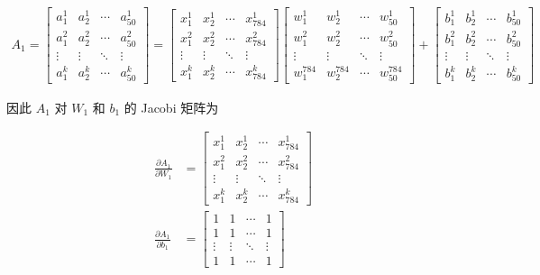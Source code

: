\documentclass[12pt,a4paper]{amsart}
\begin{document}
\begin{equation}
	\begin{aligned}
		A_1 = \begin{bmatrix}
			a_1^1  & a_2^1  & \cdots & a_{50}^1 \\
			a_1^2  & a_2^2  & \cdots & a_{50}^2 \\
			\vdots & \vdots & \ddots & \vdots   \\
			a_1^k  & a_2^k  & \cdots & a_{50}^k
		\end{bmatrix}
		= \begin{bmatrix}
			x_1^1  & x_2^1  & \cdots & x_{784}^1 \\
			x_1^2  & x_2^2  & \cdots & x_{784}^2 \\
			\vdots & \vdots & \ddots & \vdots    \\
			x_1^k  & x_2^k  & \cdots & x_{784}^k
		\end{bmatrix} \begin{bmatrix}
			w_1^1     & w_2^1     & \cdots & w_{50}^1     \\
			w_1^2     & w_2^2     & \cdots & w_{50}^2     \\
			\vdots    & \vdots    & \ddots & \vdots       \\
			w_1^{784} & w_2^{784} & \cdots & w_{50}^{784}
		\end{bmatrix} + \begin{bmatrix}
			b_1^1  & b_2^1  & \cdots & b_{50}^1 \\
			b_1^2  & b_2^2  & \cdots & b_{50}^2 \\
			\vdots & \vdots & \ddots & \vdots   \\
			b_1^k  & b_2^k  & \cdots & b_{50}^k
		\end{bmatrix}
	\end{aligned}
\end{equation}

因此 $A_1$ 对 $W_1$ 和 $b_1$ 的 Jacobi 矩阵为

\begin{equation}
	\begin{aligned}
		\frac{\partial A_1}{\partial W_1} & = \begin{bmatrix}
			x_1^1  & x_2^1  & \cdots & x_{784}^1 \\
			x_1^2  & x_2^2  & \cdots & x_{784}^2 \\
			\vdots & \vdots & \ddots & \vdots    \\
			x_1^k  & x_2^k  & \cdots & x_{784}^k
		\end{bmatrix} \\
		\frac{\partial A_1}{\partial b_1} & = \begin{bmatrix}
			1      & 1      & \cdots & 1      \\
			1      & 1      & \cdots & 1      \\
			\vdots & \vdots & \ddots & \vdots \\
			1      & 1      & \cdots & 1
		\end{bmatrix}
	\end{aligned}
\end{equation}
\end{document}
